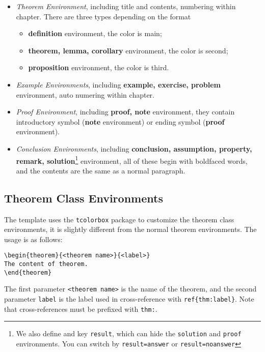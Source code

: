 \documentclass[noanswer,fancy,blue,11pt,hide]{elegantbook}
\begin{document}
\begin{itemize}
\item \textit{Theorem Environment}, including title and contents, numbering within chapter. There are three types depending on the format
   \begin{itemize}
      \item \textcolor{main}{\textbf{definition}} environment, the color is  \textcolor{main}{main};
      \item \textcolor{second}{\textbf{theorem, lemma, corollary}} environment, the color is \textcolor{second} {second};
      \item \textcolor{third}{\textbf{proposition}} environment, the color is \textcolor{third}{third}.
   \end{itemize}
\item \textit{Example Environments}, including \textbf{example, exercise, problem} environment, auto numering within chapter.
\item \textit{Proof Environment}, including \textbf{proof, note} environment, they contain introductory symbol (\textbf{note} environment) or ending symbol (\textbf{proof} environment).
\item \textit{Conclusion Environments}, including \textbf{conclusion, assumption, property, remark, solution}\footnote{We also define and key \lstinline{result}, which can hide the \lstinline{solution} and \lstinline{proof} environments. You can switch by \lstinline{result=answer} or \lstinline{result=noanswer}} environment, all of these begin with boldfaced words, and the contents are the same as a normal paragraph.
\end{itemize}

\subsection{Theorem Class Environments}
The template uses the \lstinline{tcolorbox} package to customize the theorem class environments, it is slightly different from the normal theorem environments. The usage is as follows:
\begin{lstlisting}
\begin{theorem}{<theorem name>}{<label>}
The content of theorem.
\end{theorem}
\end{lstlisting}

The first parameter \lstinline{<theorem name>} is the name of the theorem, and the second parameter \lstinline{label} is the label used in cross-reference with \verb|ref{thm:label}|. Note that cross-references must be prefixed with \lstinline{thm:}. 
\end{document}
